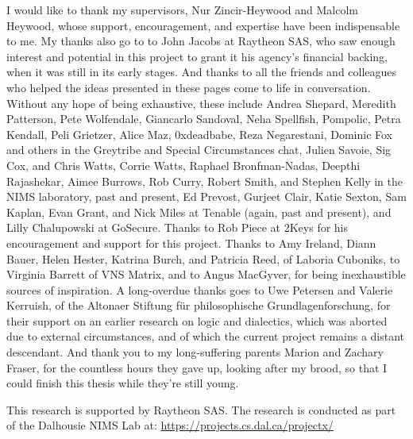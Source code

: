 \begin{acknowledgements}
I would like to thank my supervisors, Nur
Zincir-Heywood and Malcolm Heywood, whose support, encouragement, and expertise
have been indispensable to me. My thanks also go to to John Jacobs at Raytheon
SAS, who saw enough interest and potential in this project to grant it his
agency's financial backing, when it was still in its early stages. And thanks to
all the friends and colleagues who helped the ideas presented in these pages
come to life in conversation. Without any hope of being exhaustive, these
include Andrea Shepard, Meredith Patterson, Pete Wolfendale, Giancarlo Sandoval,
Neha Spellfish, Pompolic, Petra Kendall, Peli Grietzer, Alice Maz, 0xdeadbabe,
Reza Negarestani, Dominic Fox and others in the Greytribe and Special
Circumstances chat, Julien Savoie, Sig Cox, and Chris Watts, Corrie Watts,
Raphael Bronfman-Nadas, Deepthi Rajashekar, Aimee Burrows, Rob Curry, Robert
Smith, and Stephen Kelly in the NIMS laboratory, past and present, Ed Prevost,
Gurjeet Clair, Katie Sexton, Sam Kaplan, Evan Grant, and Nick Miles at Tenable
(again, past and present), and Lilly Chalupowski at GoSecure. Thanks to Rob
Piece at 2Keys for his encouragement and support for this project. Thanks to Amy
Ireland, Diann Bauer, Helen Hester, Katrina Burch, and Patricia Reed, of Laboria
Cuboniks, to Virginia Barrett of VNS Matrix, and to Angus MacGyver, for being
inexhaustible sources of inspiration. A long-overdue thanks goes to Uwe Petersen
and Valerie Kerruish, of the Altonaer Stiftung für philosophische
Grundlagenforschung, for their support on an earlier research on logic and
dialectics, which was aborted due to external circumstances, and of which the
current project remains a distant descendant. And thank you to my long-suffering
parents Marion and Zachary Fraser, for the countless hours they gave up, looking
after my brood, so that I could finish this thesis while they're still young.

This research is supported by Raytheon SAS. The research is conducted
as part of the Dalhousie NIMS Lab at: \url{https://projects.cs.dal.ca/projectx/}
\end{acknowledgements}

\clearpage
\mainmatter